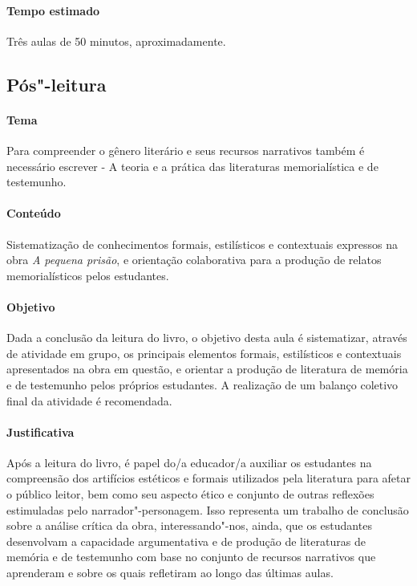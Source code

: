 \documentclass[11pt]{extarticle}
\begin{document}

\paragraph{Tempo estimado} Três aulas de 50 minutos, aproximadamente.


\subsection{Pós"-leitura}

\paragraph{Tema} Para compreender o gênero literário e seus recursos
narrativos também é necessário escrever - A teoria e a prática das
literaturas memorialística e de testemunho.

\paragraph{Conteúdo} Sistematização de conhecimentos formais, estilísticos
e contextuais expressos na obra \emph{A pequena prisão}, e orientação
colaborativa para a produção de relatos memorialísticos pelos
estudantes.

\paragraph{Objetivo} Dada a conclusão da leitura do livro, o objetivo
desta aula é sistematizar, através de atividade em grupo, os principais
elementos formais, estilísticos e contextuais apresentados na obra em
questão, e orientar a produção de literatura de memória e de testemunho
pelos próprios estudantes. A realização de um balanço coletivo final da
atividade é recomendada.

\paragraph{Justificativa} Após a leitura do livro, é papel do/a educador/a
auxiliar os estudantes na compreensão dos artifícios estéticos e formais
utilizados pela literatura para afetar o público leitor, bem como seu
aspecto ético e conjunto de outras reflexões estimuladas pelo
narrador"-personagem. Isso representa um trabalho de conclusão sobre a
análise crítica da obra, interessando"-nos, ainda, que os estudantes
desenvolvam a capacidade argumentativa e de produção de literaturas de
memória e de testemunho com base no conjunto de recursos narrativos que
aprenderam e sobre os quais refletiram ao longo das últimas aulas.
\end{document}
